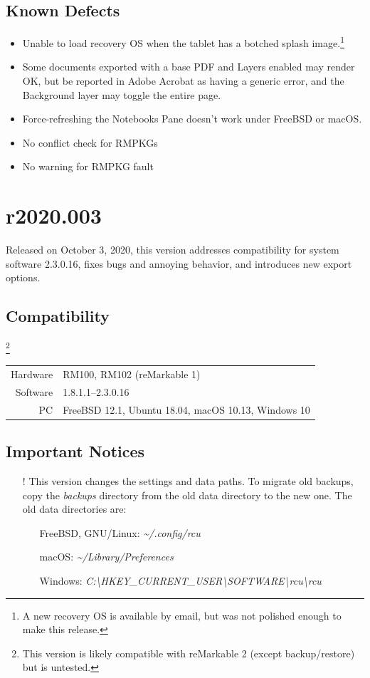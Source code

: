 \documentclass{memoir}
\begin{document}
{{\subsection{Known Defects}
\begin{itemize}
\item{Unable to load recovery OS when the tablet has a botched splash image.\footnote{A new recovery OS is available by email, but was not polished enough to make this release.}}
\item{Some documents exported with a base PDF and Layers enabled may render OK, but be reported in Adobe Acrobat as having a generic error, and the Background layer may toggle the entire page.}
\item{Force-refreshing the Notebooks Pane doesn't work under FreeBSD or macOS.}
\item{No conflict check for RMPKGs}
\item{No warning for RMPKG fault}
\end{itemize}




\newpage
\section{r2020.003}
\label{sec:r2020-003}
Released on October 3, 2020, this version addresses compatibility for system software 2.3.0.16, fixes bugs and annoying behavior, and introduces new export options.

\subsection{Compatibility}
\footnote{This version is likely compatible with reMarkable 2 (except backup/restore) but is untested.}
\begin{tabular}{ r | l }
  Hardware & RM100, RM102 (reMarkable 1) \\
  Software & 1.8.1.1--2.3.0.16 \\
  PC & FreeBSD 12.1, Ubuntu 18.04, macOS 10.13, Windows 10 \\
\end{tabular}

\subsection{Important Notices}
\begin{itemize}
\item[!]{This version changes the settings and data paths. To migrate old backups, copy the \textit{backups} directory from the old data directory to the new one. The old data directories are:}
  \begin{itemize}
  \item[]{FreeBSD, GNU/Linux: \textit{\textasciitilde/.config/rcu}}
  \item[]{macOS: \textit{\textasciitilde/Library/Preferences}}
  \item[]{Windows: \textit{C:\textbackslash HKEY\_CURRENT\_USER\textbackslash SOFTWARE\textbackslash rcu\textbackslash rcu}}
  \end{itemize}
\end{itemize}

}}
\end{document}
